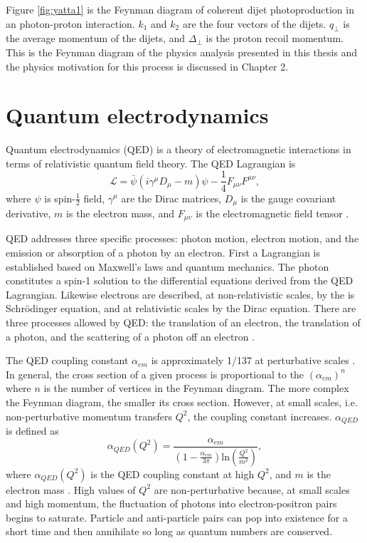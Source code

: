 Figure \ref{fig:yatta1} is the Feynman diagram of coherent dijet photoproduction in an photon-proton interaction. $k_1$ and $k_2$ are the four vectors of the dijets. $q_\perp$ is the average momentum of the dijets, and $\Delta_\perp$ is the proton recoil momentum. This is the Feynman diagram of the physics analysis presented in this thesis and the physics motivation for this process is discussed in Chapter 2.

\section{Quantum electrodynamics}

Quantum electrodynamics (QED) is a theory of electromagnetic interactions in terms of relativistic quantum field theory. The QED Lagrangian is
\begin{equation}
{\mathcal {L}}={\bar {\psi }}(i\gamma ^{\mu }D_{\mu }-m)\psi -{\frac {1}{4}}F_{\mu \nu }F^{\mu \nu },
\end{equation} 
where $\psi$ is spin-$\frac{1}{2}$ field, $\gamma^\mu$ are the Dirac matrices, $D_\mu$ is the gauge covariant derivative, $m$ is the electron mass, and $F_{\mu\upsilon}$ is the electromagnetic field tensor \cite{Peskin:1995ev}.

QED addresses three specific processes: photon motion, electron motion, and the emission or absorption of a photon by an electron. First a Lagrangian is established based on Maxwell's laws and quantum mechanics. The photon constitutes a spin-1 solution to the differential equations derived from the QED Lagrangian. Likewise electrons are described, at non-relativistic scales, by the is Schr\"{o}dinger equation, and at relativistic scales by the Dirac equation. There are three processes allowed by QED: the translation of an electron, the translation of a photon, and the scattering of a photon off an electron \cite{Griffiths:2008zz}. 

The QED coupling constant $\alpha_{em}$ is approximately 1/137 at perturbative scales \cite{Bouchendira:2010es}. In general, the cross section of a given process is proportional to the $(\alpha_{em})^n$ where $n$ is the number of vertices in the Feynman diagram. The more complex the Feynman diagram, the smaller its cross section. However, at small scales, i.e. non-perturbative momentum transfers $Q^2$, the coupling constant increases. $\alpha_{QED}$ is defined as
\begin{equation}
\alpha_{QED}(Q^2) = \frac{ \alpha_{em}}{(1 - \frac{\alpha_{em}}{3\pi})\mathrm{ln}(\frac{Q^2}{m^2}) },
\end{equation}
where $\alpha_{QED}(Q^2)$ is the QED coupling constant at high $Q^2$, and $m$ is the electron mass \cite{Abbiendi:2005rx}. High values of $Q^2$ are non-perturbative because, at small scales and high momentum, the fluctuation of photons into electron-positron pairs begins to saturate. Particle and anti-particle pairs can pop into existence for a short time and then annihilate so long as quantum numbers are conserved. 

